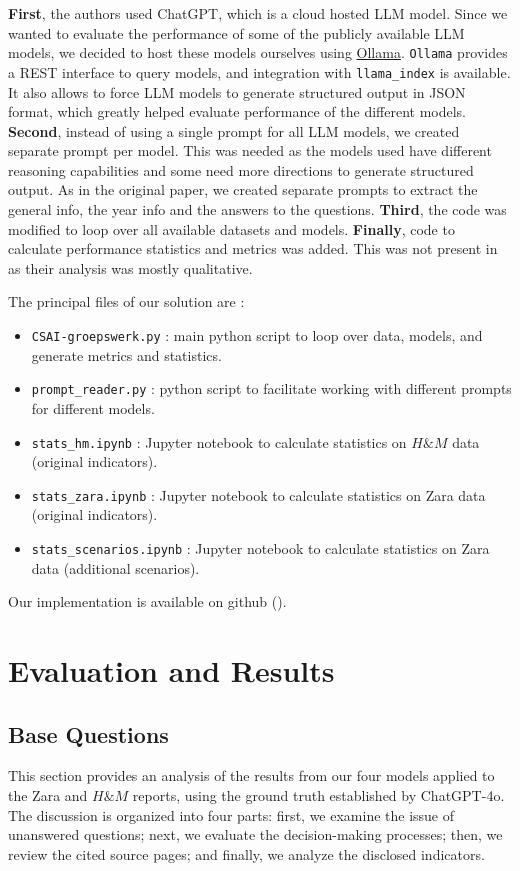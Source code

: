 \documentclass[]{article}
\begin{document}
\textbf{First}, the authors used ChatGPT, which is a cloud hosted LLM model.
Since we wanted to evaluate the performance of some of the publicly available LLM models, we decided to host these models ourselves using \href{https://ollama.com/}{Ollama}.
\texttt{Ollama} provides a REST interface to query models, and integration with \texttt{llama\_index} is available.
It also allows to force LLM models to generate structured output in JSON format, which greatly helped evaluate performance of the different models.
\textbf{Second}, instead of using a single prompt for all LLM models, we created separate prompt per model.
This was needed as the models used have different reasoning capabilities and some need more directions to generate structured output.
As in the original paper, we created separate prompts to extract the general info, the year info and the answers to the questions.
\textbf{Third}, the code was modified to loop over all available datasets and models.
\textbf{Finally}, code to calculate performance statistics and metrics was added.
This was not present in \cite{durability} as their analysis was mostly qualitative.

The principal files of our solution are :

\begin{itemize}
    \item \texttt{CSAI-groepswerk.py} : main python script to loop over data, models, and generate metrics and statistics.
    \item \texttt{prompt\_reader.py} : python script to facilitate working with different prompts for different models.
    \item \texttt{stats\_hm.ipynb} : Jupyter notebook to calculate statistics on $H\&M$ data (original indicators).
    \item \texttt{stats\_zara.ipynb} : Jupyter notebook to calculate statistics on Zara data (original indicators).
    \item \texttt{stats\_scenarios.ipynb} : Jupyter notebook to calculate statistics on Zara data (additional scenarios).
\end{itemize}

Our implementation is available on github (\cite{github}).

\section{Evaluation and Results} \label{sec:evaluation}
\subsection{Base Questions}
This section provides an analysis of the results from our four models applied to the Zara and $H\&M$ reports, using the ground truth established by ChatGPT-4o.
The discussion is organized into four parts: first, we examine the issue of unanswered questions; 
next, we evaluate the decision-making processes; then, we review the cited source pages; and finally, 
we analyze the disclosed indicators.
\end{document}
